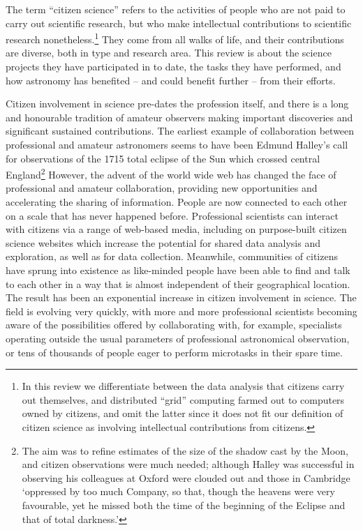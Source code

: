 \documentclass{ar2e}
\begin{document}
The term ``citizen science'' refers to the activities of people who are not paid
to carry out scientific research, but who make intellectual contributions to
scientific research nonetheless.\footnote{In this review we differentiate
between the data analysis that citizens carry out themselves, and  distributed
``grid'' computing farmed out to computers owned by citizens, and omit the
latter since it does not fit our definition of citizen science as involving
intellectual  contributions from citizens.} They come from all walks of life,
and their contributions are diverse, both in type and research area. This review
is about the science projects they have participated in to date, the tasks they
have performed, and how astronomy has benefited -- and could benefit further --
from their efforts.

Citizen involvement in science pre-dates the profession itself, and there is a
long and honourable tradition of amateur observers making important discoveries
and significant sustained contributions. The earliest example of collaboration between professional and amateur astronomers seems to have been Edmund Halley's call for observations of the 1715 total eclipse of the Sun which crossed central England\citep{Halley}\footnote{The aim was to refine estimates of the size of the shadow cast by the Moon, and citizen observations were much needed; although Halley was successful in observing his colleagues at Oxford were clouded out and those in Cambridge `oppressed by too much Company, so that, though the heavens were very favourable, yet he missed both the time of the beginning of the Eclipse and that of total darkness.'}  However, the advent of the
world wide web has changed the face of professional and amateur collaboration,
providing new opportunities and accelerating the sharing of information. People
are now connected to each other on a scale that has never happened before.
Professional scientists can interact with citizens via a range of web-based
media, including on purpose-built citizen science websites which increase the
potential for shared data analysis and exploration, as well as for data
collection. Meanwhile, communities of citizens have sprung into existence as
like-minded people have been able to find and talk to each other in a way that
is almost independent of their geographical location. The result has been an
exponential increase in citizen involvement in science. The field is evolving
very quickly, with more and more professional scientists becoming aware of the
possibilities offered by collaborating with, for example, specialists operating
outside the usual parameters of professional astronomical observation, or tens
of thousands of people eager to perform microtasks in their spare time.  
\end{document}
